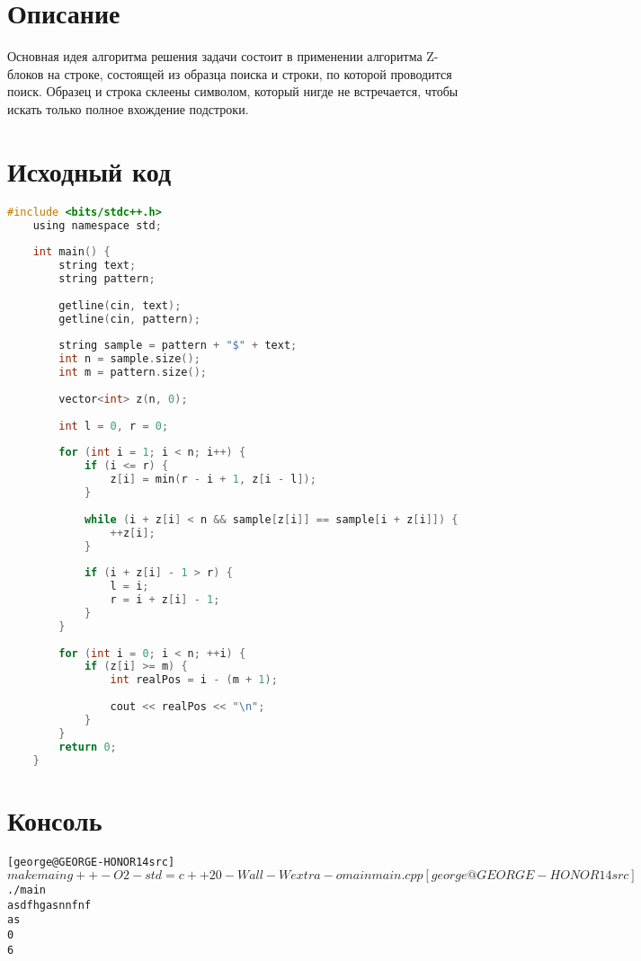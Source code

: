 \section{Описание}
Основная идея алгоритма решения задачи состоит в применении алгоритма Z-блоков на строке, состоящей из образца поиска и строки, по которой проводится поиск. 
Образец и строка склеены символом, который нигде не встречается, чтобы искать только полное вхождение подстроки.

\pagebreak

\section{Исходный код}
\begin{lstlisting}[language=C]
    #include <bits/stdc++.h>
    using namespace std;
    
    int main() {
        string text;
        string pattern;
    
        getline(cin, text);
        getline(cin, pattern);
    
        string sample = pattern + "$" + text;
        int n = sample.size();
        int m = pattern.size();
    
        vector<int> z(n, 0);
    
        int l = 0, r = 0;
    
        for (int i = 1; i < n; i++) {
            if (i <= r) {
                z[i] = min(r - i + 1, z[i - l]);
            }
    
            while (i + z[i] < n && sample[z[i]] == sample[i + z[i]]) {
                ++z[i];
            }
    
            if (i + z[i] - 1 > r) {
                l = i;
                r = i + z[i] - 1;
            }
        }
    
        for (int i = 0; i < n; ++i) {
            if (z[i] >= m) {
                int realPos = i - (m + 1);
    
                cout << realPos << "\n";
            }
        }
        return 0;
    }    

\end{lstlisting}

\pagebreak

\section{Консоль}
\begin{alltt}
[george@GEORGE-HONOR14 src]$ make main
g++ -O2 -std=c++20 -Wall -Wextra -o main main.cpp
[george@GEORGE-HONOR14 src]$ ./main
asdfhgasnnfnf
as
0
6
\end{alltt}
\pagebreak

